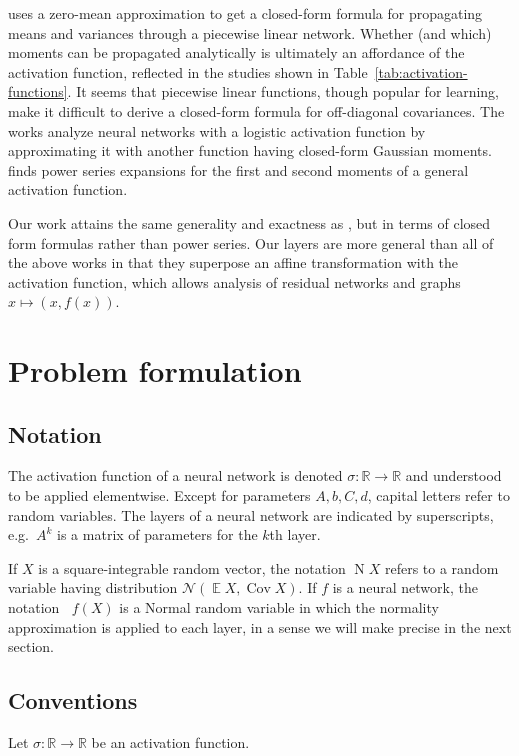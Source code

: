 \documentclass{article}
\DeclareMathOperator{\expect}{\mathbb{E}}
\DeclareMathOperator{\Cov}{\operatorname{Cov}}
\DeclareMathOperator{\normal}{\mathrm N}
\DeclareMathOperator{\Normal}{\mathrm N^*}
\begin{document}
\citet{bibi_analytic_2018} uses a zero-mean approximation to get a closed-form formula for propagating means and variances through a piecewise linear network.
Whether (and which) moments can be propagated analytically is ultimately an affordance of the activation function, reflected in the studies shown in Table~\ref{tab:activation-functions}.
It seems that piecewise linear functions, though popular for learning, make it difficult to derive a closed-form formula for off-diagonal covariances.
The works  \citet{astudillo_propagation_2011,abdelaziz_uncertainty_2015,huber_bayesian_2020} analyze neural networks with a logistic activation function by approximating it with another function having closed-form Gaussian moments.
\citet{wright_analytic_2024} finds power series expansions for the first and second moments of a general activation function.

Our work attains the same generality and exactness as \citet{wright_analytic_2024}, but in terms of closed form formulas rather than power series.
Our layers are more general than all of the above works in that they superpose an affine transformation with the activation function, which allows analysis of residual networks and graphs \(x \mapsto (x, f(x))\).

\section{Problem formulation}
\subsection{Notation}
The activation function of a neural network is denoted \(\sigma:\mathbb R \to \mathbb R\) and understood to be applied elementwise.
Except for parameters \(A, b, C, d\), capital letters refer to random variables.
The layers of a neural network are indicated by superscripts, e.g.~\(A^k\) is a matrix of parameters for the \(k\)th layer.

If \(X\) is a square-integrable random vector, the notation \(\normal X\) refers to a random variable having distribution \(\mathcal N(\expect X, \Cov X)\).
If \(f\) is a neural network, the notation \(\Normal f(X)\) is a Normal random variable in which the normality approximation is applied to each layer, in a sense we will make precise in the next section.

\subsection{Conventions}
Let \(\sigma : \mathbb R \to \mathbb R\) be an activation function.
\end{document}
